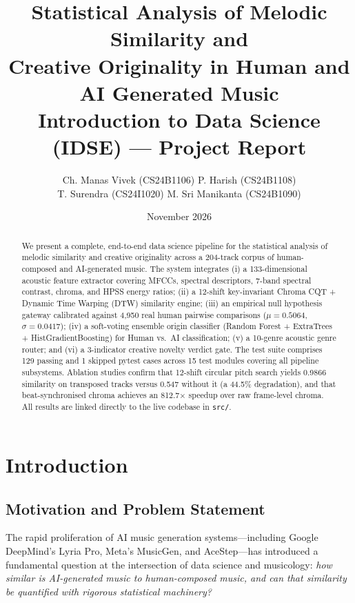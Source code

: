 \documentclass[12pt,a4paper]{article}
\title{%
  \LARGE\bfseries Statistical Analysis of Melodic Similarity and\\
  Creative Originality in Human and AI Generated Music\\[0.5em]
  \large Introduction to Data Science (IDSE) --- Project Report
}
\author{%
  Ch. Manas Vivek (CS24B1106) \quad P. Harish (CS24B1108)\\[0.3em]
  T. Surendra (CS24I1020) \quad M. Sri Manikanta (CS24B1090)
}
\date{November 2026}
\begin{document}
\maketitle
\thispagestyle{fancy}

\begin{abstract}
\noindent
We present a complete, end-to-end data science pipeline for the statistical
analysis of melodic similarity and creative originality across a 204-track
corpus of human-composed and AI-generated music. The system integrates
(i) a 133-dimensional acoustic feature extractor covering MFCCs, spectral
descriptors, 7-band spectral contrast, chroma, and HPSS energy ratios;
(ii) a 12-shift key-invariant Chroma CQT + Dynamic Time Warping (DTW)
similarity engine; (iii) an empirical null hypothesis gateway calibrated
against 4,950 real human pairwise comparisons ($\mu = 0.5064$,
$\sigma = 0.0417$); (iv) a soft-voting ensemble origin classifier (Random
Forest + ExtraTrees + HistGradientBoosting) for Human vs.\ AI classification;
(v) a 10-genre acoustic genre router; and (vi) a 3-indicator creative
novelty verdict gate. The test suite comprises 129 passing and 1 skipped
pytest cases across 15 test modules covering all pipeline subsystems.
Ablation studies confirm that 12-shift circular pitch search yields
0.9866 similarity on transposed tracks versus 0.547 without it
(a 44.5\% degradation), and that beat-synchronised chroma achieves an
812.7$\times$ speedup over raw frame-level chroma. All results are
linked directly to the live codebase in \texttt{src/}.
\end{abstract}

\tableofcontents
\newpage

\section{Introduction}
\label{sec:intro}

\subsection{Motivation and Problem Statement}

The rapid proliferation of AI music generation systems---including
Google DeepMind's Lyria Pro, Meta's MusicGen, and AceStep---has introduced
a fundamental question at the intersection of data science and musicology:
\emph{how similar is AI-generated music to human-composed music, and can that
similarity be quantified with rigorous statistical machinery?}
\end{document}
